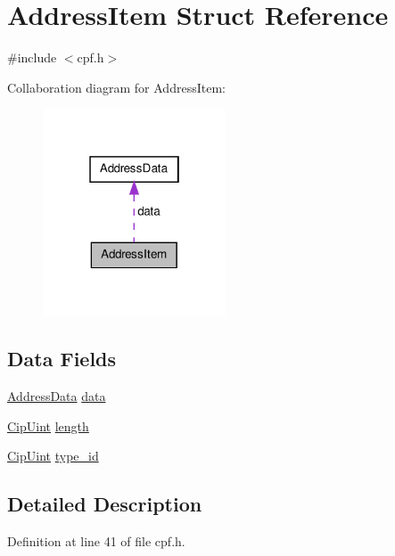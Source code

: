 \hypertarget{structAddressItem}{\section{\-Address\-Item \-Struct \-Reference}
\label{d3/d56/structAddressItem}
}


{\ttfamily \#include $<$cpf.\-h$>$}



\-Collaboration diagram for \-Address\-Item\-:
\nopagebreak
\begin{figure}[H]
\begin{center}
\leavevmode
\includegraphics[width=154pt]{d3/db1/structAddressItem__coll__graph}
\end{center}
\end{figure}
\subsection*{\-Data \-Fields}
\begin{DoxyCompactItemize}
\item 
\hyperlink{structAddressData}{\-Address\-Data} \hyperlink{structAddressItem_ae405cdded64b36b5bbad607ea251865a}{data}
\item 
\hyperlink{typedefs_8h_a72c0fba927c5681c44dbf59147578fc7}{\-Cip\-Uint} \hyperlink{structAddressItem_a8651f8610143cd0ef830abdc1fcf00b2}{length}
\item 
\hyperlink{typedefs_8h_a72c0fba927c5681c44dbf59147578fc7}{\-Cip\-Uint} \hyperlink{structAddressItem_a9b3cf54385b7e3db0c41d4d394c2d465}{type\-\_\-id}
\end{DoxyCompactItemize}


\subsection{\-Detailed \-Description}


\-Definition at line 41 of file cpf.\-h.



